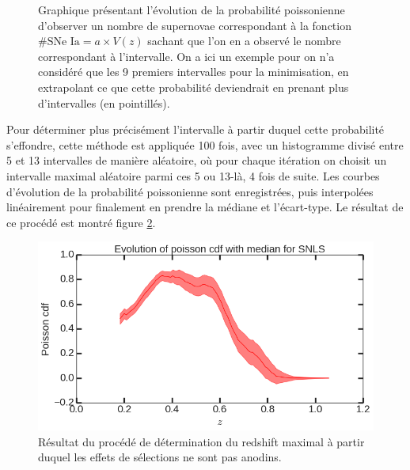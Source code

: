 \documentclass[a4paper, 12pt, svgnames]{article}
\begin{document}
\begin{figure}[htbp!]
    \centering
    \captionsetup{justification=centering}
    \caption{Graphique présentant l'évolution de la probabilité poissonienne
        d'observer un nombre de supernovae correspondant à la fonction
        $\#\text{SNe Ia} = a\times V(z)$ sachant que l'on en a observé le nombre
        correspondant à l'intervalle. On a ici un exemple pour on n'a considéré
        que les 9 premiers intervalles pour la minimisation, en extrapolant ce
        que cette probabilité deviendrait en prenant plus d'intervalles (en
        pointillés).}
    \label{zmax_method}
\end{figure}

Pour déterminer plus précisément l'intervalle à partir duquel cette probabilité
s'effondre, cette méthode est appliquée 100 fois, avec un histogramme divisé
entre 5 et 13 intervalles de manière aléatoire, où pour chaque itération on
choisit un intervalle maximal aléatoire parmi ces 5 ou 13-là, 4 fois de suite.
Les courbes d'évolution de la probabilité poissonienne sont enregistrées, puis
interpolées linéairement pour finalement en prendre la médiane et l'écart-type.
Le résultat de ce procédé est montré figure \ref{zmax_result}.

\begin{figure}[htbp!]
    \centering
    \includegraphics[width=.5\linewidth]{Rapport_figures/zmax_result.png}
    \captionsetup{justification=centering}
    \caption{Résultat du procédé de détermination du redshift maximal à partir
    duquel les effets de sélections ne sont pas anodins.}
    \label{zmax_result}
\end{figure}
\end{document}
